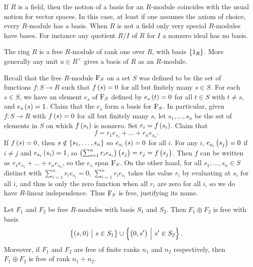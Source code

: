 
\begin{remark}
If $ R $ is a field, then the notion of a basis for an $ R $-module coincides with the usual notion for vector spaces. In this case, at least if one assumes the axiom of choice, every $ R $-module has a basis. When $ R $ is not a field only very special $ R $-modules have bases. For instance any quotient $ R / I $ of $ R $ for $ I $ a nonzero ideal has no basis.
\end{remark}

\begin{example*}
The ring $ R $ is a free $ R $-module of rank one over $ R $, with basis $ \cbr{1_R} $. More generally any unit $ u \in R^\times $ gives a basis of $ R $ as an $ R $-module.
\end{example*}

Recall that the free $ R $-module $ \mathrm{F}_S $ on a set $ S $ was defined to be the set of functions $ f : S \to R $ such that $ f\br{s} = 0 $ for all but finitely many $ s \in S $. For each $ s \in S $, we have an element $ e_s $ of $ \mathrm{F}_S $ defined by $ e_s\br{t} = 0 $ for all $ t \in S $ with $ t \ne s $, and $ e_s\br{s} = 1 $. Claim that the $ e_s $ form a basis for $ \mathrm{F}_S $. In particular, given $ f : S \to R $ with $ f\br{s} = 0 $ for all but finitely many $ s $, let $ s_1, \dots, s_n $ be the set of elements in $ S $ on which $ f\br{s_i} $ is nonzero. Set $ r_i = f\br{s_i} $. Claim that
$$ f = r_1e_{s_1} + \dots + r_ne_{s_n}. $$
If $ f\br{s} = 0 $, then $ s \notin \cbr{s_1, \dots, s_n} $ so $ e_{s_i}\br{s} = 0 $ for all $ i $. For any $ i $, $ e_{s_i}\br{s_j} = 0 $ if $ i \ne j $ and $ e_{s_i}\br{s_i} = 1 $, so $ \br{\sum_{i = 1}^n r_ie_{s_i}}\br{s_j} = r_j = f\br{s_j} $. Then $ f $ can be written as $ r_1e_{s_1} + \dots + r_ne_{s_n} $, so the $ e_s $ span $ \mathrm{F}_S $. On the other hand, for all $ s_1, \dots, s_n \in S $ distinct with $ \sum_{i = 1}^n r_ie_{s_i} = 0 $, $ \sum_{i = 1}^n r_ie_{s_i} $ takes the value $ r_i $ by evaluating at $ s_i $ for all $ i $, and thus is only the zero function when all $ r_i $ are zero for all $ i $, so we do have $ R $-linear independence. Thus $ \mathrm{F}_S $ is free, justifying its name.

\pagebreak

\begin{proposition}
Let $ F_1 $ and $ F_2 $ be free $ R $-modules with basis $ S_1 $ and $ S_2 $. Then $ F_1 \oplus F_2 $ is free with basis
$$ \cbr{\br{s, 0} \st s \in S_1} \cup \cbr{\br{0, s'} \st s' \in S_2}. $$ Moreover, if $ F_1 $ and $ F_2 $ are free of finite ranks $ n_1 $ and $ n_2 $ respectively, then $ F_1 \oplus F_2 $ is free of rank $ n_1 + n_2 $.
\end{proposition}

